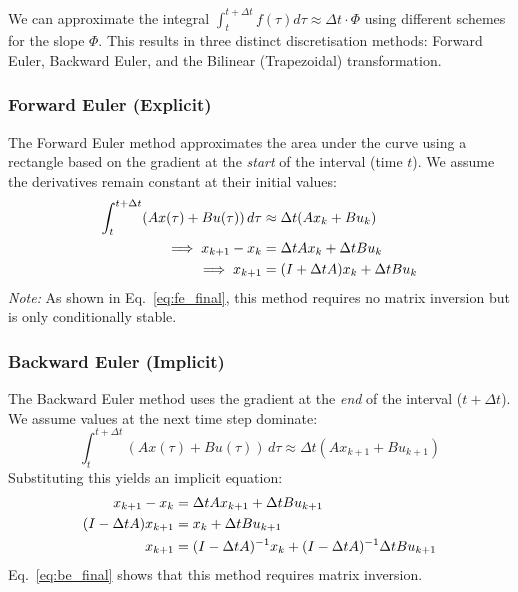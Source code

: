 \documentclass[a4paper,11pt]{article}
\begin{document}
We can approximate the integral $\int_{t}^{t+\Delta t} f(\tau) d\tau \approx \Delta t \cdot \Phi$ using different schemes for the slope $\Phi$. This results in three distinct discretisation methods: Forward Euler, Backward Euler, and the Bilinear (Trapezoidal) transformation.

\subsubsection{Forward Euler (Explicit)}
The Forward Euler method approximates the area under the curve using a rectangle based on the gradient at the \textit{start} of the interval (time $t$). We assume the derivatives remain constant at their initial values:
\begin{align} 
    \int_{t}^{t+\Delta t} (A x(\tau) + B u(\tau)) \, d\tau &\approx \Delta t (A x_k + B u_k) \label{eq:fe_approx} \\
    \implies x_{k+1} - x_k &= \Delta t A x_k + \Delta t B u_k \notag \\
    \implies x_{k+1} &= (I + \Delta t A) x_k + \Delta t B u_k \label{eq:fe_final}
\end{align}
\textit{Note:} As shown in Eq.~\eqref{eq:fe_final}, this method requires no matrix inversion but is only conditionally stable.

\subsubsection{Backward Euler (Implicit)}
The Backward Euler method uses the gradient at the \textit{end} of the interval ($t + \Delta t$). We assume values at the next time step dominate:
\begin{equation}
    \int_{t}^{t+\Delta t} (A x(\tau) + B u(\tau)) \, d\tau \approx \Delta t (A x_{k+1} + B u_{k+1})
\end{equation}
Substituting this yields an implicit equation:
\begin{align}
    x_{k+1} - x_k &= \Delta t A x_{k+1} + \Delta t B u_{k+1} \notag \\
    (I - \Delta t A) x_{k+1} &= x_k + \Delta t B u_{k+1} \notag \\
    x_{k+1} &= (I - \Delta t A)^{-1} x_k + (I - \Delta t A)^{-1} \Delta t B u_{k+1} \label{eq:be_final}
\end{align}
Eq.~\eqref{eq:be_final} shows that this method requires matrix inversion.
\end{document}
